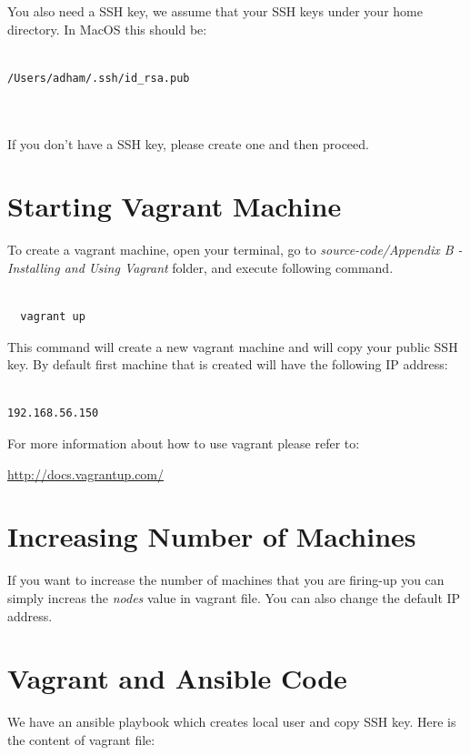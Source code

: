 \documentclass[10pt]{book}
\begin{document}
\begin{appendices}
You also need a SSH key, we assume that your SSH keys under your home directory. In MacOS this should be:

\begin{verbatim}

/Users/adham/.ssh/id_rsa.pub

   
\end{verbatim}

If you don't have a SSH key, please create one and then proceed.


\section{Starting Vagrant Machine}
To create a vagrant machine, open your terminal, go to 
\emph{source-code/Appendix B - Installing and Using Vagrant} folder, and 
execute following command.

\begin{verbatim}
  
  vagrant up

\end{verbatim}

This command will create a new vagrant machine and will copy your public SSH key. 
By default first machine that is created will have the following IP address:

\begin{verbatim}
  
192.168.56.150

\end{verbatim}

For more information about how to use vagrant please refer to:

\url{http://docs.vagrantup.com/}


\section{Increasing Number of Machines}
If you want to increase the number of machines that you are firing-up you can 
simply increas the \emph{nodes} value in vagrant file. You can also change the 
default IP address.


\section{Vagrant and Ansible Code}
We have an ansible playbook which creates local user and copy SSH key. Here is the content of vagrant file:

\begin{verbatim}


\end{verbatim}
\end{appendices}
\end{document}
